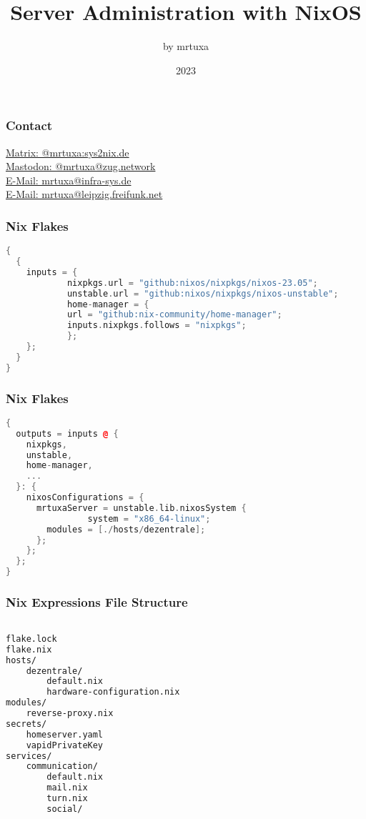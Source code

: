 \documentclass{beamer}
\title{Server Administration \newline with NixOS}
\author{by mrtuxa}
\date{2023}
\begin{document}
\frame{\titlepage}

\begin{frame}
\frametitle{Contact}

\href{http://www.latex-tutorial.com}{Matrix: @mrtuxa:sys2nix.de} \\
\href{https://zug.network/@mrtuxa}{Mastodon: @mrtuxa@zug.network} \\
\href{mailto:mrtuxa@infra-sys.de}{E-Mail: mrtuxa@infra-sys.de} \\
\href{mailto:mrtuxa@leipzig.freifunk.net}{E-Mail: mrtuxa@leipzig.freifunk.net}
    
\end{frame}

\begin{frame}[fragile]
\frametitle{Nix Flakes}

\begin{lstlisting}[language=c++]
{
  {
  	inputs = {
    		nixpkgs.url = "github:nixos/nixpkgs/nixos-23.05";
    		unstable.url = "github:nixos/nixpkgs/nixos-unstable";
    		home-manager = {
      		url = "github:nix-community/home-manager";
      		inputs.nixpkgs.follows = "nixpkgs";
    		};
  	};
  }
}
\end{lstlisting}

\end{frame}


\begin{frame}[fragile]
\frametitle{Nix Flakes}

\begin{lstlisting}[language=c++]
{
  outputs = inputs @ {
    nixpkgs,
    unstable,
    home-manager,
    ...
  }: {
    nixosConfigurations = {
      mrtuxaServer = unstable.lib.nixosSystem {
				system = "x86_64-linux";
        modules = [./hosts/dezentrale];
      };
    };
  };
}
\end{lstlisting}

\end{frame}

\begin{frame}[fragile]
\frametitle{Nix Expressions File Structure}

\begin{lstlisting}[language=bash]

flake.lock
flake.nix
hosts/
	dezentrale/
		default.nix
		hardware-configuration.nix
modules/
	reverse-proxy.nix
secrets/
	homeserver.yaml
	vapidPrivateKey
services/
	communication/
		default.nix
		mail.nix
		turn.nix
		social/

\end{lstlisting}

\end{frame}
\end{document}
